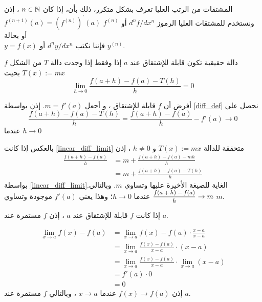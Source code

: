 \begin{note}
    المشتقات من الرتب العليا تعرف بشكل متكرر، ذلك بأن، إذا كان $n\in\mathbb{N}$ ، إذن \\$f^{(n+1)}(a)=(f^{(n)})^{\prime}(a)$
    ونستخدم للمشتقات العليا الرموز $d^nf/dx^n$ أو $f^{(n)}$ أو بحالة \\$y=f(x)$ فإننا نكتب $d^ny/dx^n$ أو $y^{(n)}$.
\end{note}
\begin{theorem}
    \label{linear_function_diff'able_Theorem_R}
    $f$ دالة حقيقية تكون قابلة للإشتقاق عند $a$ إذا وفقط إذا وجدت دالة $T$ من الشكل $T(x):=mx$ بحيث
\begin{equation}
    \label{linear_diff_limit}
    \lim\limits_{h\to0}\frac{f(a+h)-f(a)-T(h)}{h}=0
\end{equation}
\end{theorem}
\begin{myproof}
    أفرض أن $f$ قابلة للإشتقاق ، و أجعل $m=f'(a)$. إذن بواسطة \eqref{diff_def} نحصل على
    \[
    \frac{f(a+h)-f(a)-T(h)}{h}=\frac{f(a+h)-f(a)}{h}-f'(a)\to0
    \]
    عندما $h\to0$

    بالعكس إذا كانت \eqref{linear_diff_limit} متحققة للدالة $T(x):=mx$ و $h\neq0$ ، إذن
    \begin{align*}
        \frac{f(a+h)-f(a)}{h}&=m+\frac{f(a+h)-f(a)-mh}{h}\\
       &= m+\frac{f(a+h)-f(a)-T(h)}{h}
    \end{align*}
    بواسطة \eqref{linear_diff_limit}.الغاية للصيغة الأخيرة عليها وتساوي $m$. وبالتالي $\mfrac{f(a+h)-f(a)}{h}\to m$ عندما $h\to0$؛ وهذا يعني $f'(a)$ موجودة وتساوي $m$.
\end{myproof}

\begin{theorem}
    إذا كانت $f$ قابلة للإشتقاق عند $a$ ، إذن $f$ مستمرة عند $a$.
\end{theorem}
\begin{myproof}
\vspace{-30pt}
    \begin{align*}
        \lim\limits_{x\to a}f(x)-f(a)&=\lim\limits_{x\to a}f(x)-f(a)\cdot\frac{x-a}{x-a}\\
       &= \lim\limits_{x\to a}\frac{f(x)-f(a)}{x-a}\cdot(x-a)\\
       &= \lim\limits_{x\to a}\frac{f(x)-f(a)}{x-a}\cdot\lim\limits_{x\to a}(x-a)\\
        &=f'(a)\cdot0\\
        &=0
    \end{align*}
    إذن $f(x)\to f(a)$ عندما $x\to a$ ، وبالتالي $f$ مستمرة عند $a$.
\end{myproof}

